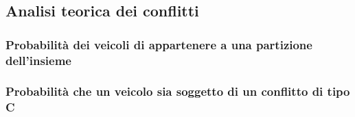 \documentclass[../../relazione.tex]{subfiles}
\begin{document}
\subsection{Analisi teorica dei conflitti}
\subsubsection{Probabilità dei veicoli di appartenere a una partizione dell'insieme}

\subsubsection{Probabilità che un veicolo sia soggetto di un conflitto di tipo C}

\end{document}
